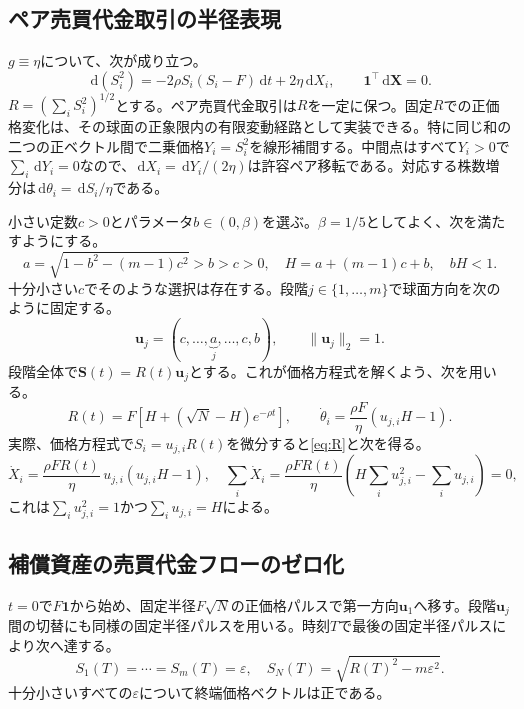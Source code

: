 \documentclass[11pt]{article}
\numberwithin{equation}{section}
\theoremstyle{definition}
\theoremstyle{remark}
\newcommand{\dd}{\,\mathrm{d}}
\newcommand{\one}{\mathbf{1}}
\begin{document}
\subsection{ペア売買代金取引の半径表現}
$g\equiv\eta$について、次が成り立つ。
\begin{equation}\label{eq:radius-appendix}
\dd(S_i^2)= -2\rho S_i(S_i-F)\dd t+2\eta\dd X_i,
\qquad \one^\top\dd\bm X=0.
\end{equation}
$R=(\sum_iS_i^2)^{1/2}$とする。ペア売買代金取引は$R$を一定に保つ。固定$R$での正価格変化は、その球面の正象限内の有限変動経路として実装できる。特に同じ和の二つの正ベクトル間で二乗価格$Y_i=S_i^2$を線形補間する。中間点はすべて$Y_i>0$で$\sum_i\dd Y_i=0$なので、$\dd X_i=\dd Y_i/(2\eta)$は許容ペア移転である。対応する株数増分は$\dd\theta_i=\dd S_i/\eta$である。

小さい定数$c>0$とパラメータ$b\in(0,\beta)$を選ぶ。$\beta=1/5$としてよく、次を満たすようにする。
\begin{equation}\label{eq:abcs}
a=\sqrt{1-b^2-(m-1)c^2}>b>c>0,
\quad
H=a+(m-1)c+b,
\quad bH<1.
\end{equation}
十分小さい$c$でそのような選択は存在する。段階$j\in\{1,\dots,m\}$で球面方向を次のように固定する。
\begin{equation}\label{eq:uj}
\bm u_j=(c,\ldots,\underbrace{a}_{j},\ldots,c,b),
\qquad \|\bm u_j\|_2=1.
\end{equation}
段階全体で$\bm S(t)=R(t)\bm u_j$とする。これが価格方程式を解くよう、次を用いる。
\begin{equation}\label{eq:R}
R(t)=F\left[H+(\sqrt N-H)e^{-\rho t}\right],
\qquad
\dot\theta_i=\frac{\rho F}{\eta}\left(u_{j,i}H-1\right).
\end{equation}
実際、価格方程式で$S_i=u_{j,i}R(t)$を微分すると\eqref{eq:R}と次を得る。
\begin{equation}\label{eq:dXdt}
\dot X_i=\frac{\rho FR(t)}\eta\,u_{j,i}(u_{j,i}H-1),
\quad \sum_i\dot X_i=\frac{\rho FR(t)}\eta\left(H\sum_i u_{j,i}^2-\sum_i u_{j,i}\right)=0,
\end{equation}
これは$\sum_i u_{j,i}^2=1$かつ$\sum_i u_{j,i}=H$による。

\subsection{補償資産の売買代金フローのゼロ化}
$t=0$で$F\one$から始め、固定半径$F\sqrt N$の正価格パルスで第一方向$\bm u_1$へ移す。段階$\bm u_j$間の切替にも同様の固定半径パルスを用いる。時刻$T$で最後の固定半径パルスにより次へ達する。
\begin{equation}\label{eq:endpoint-severe}
S_1(T)=\cdots=S_m(T)=\varepsilon,
\quad S_N(T)=\sqrt{R(T)^2-m\varepsilon^2}.
\end{equation}
十分小さいすべての$\varepsilon$について終端価格ベクトルは正である。
\end{document}
